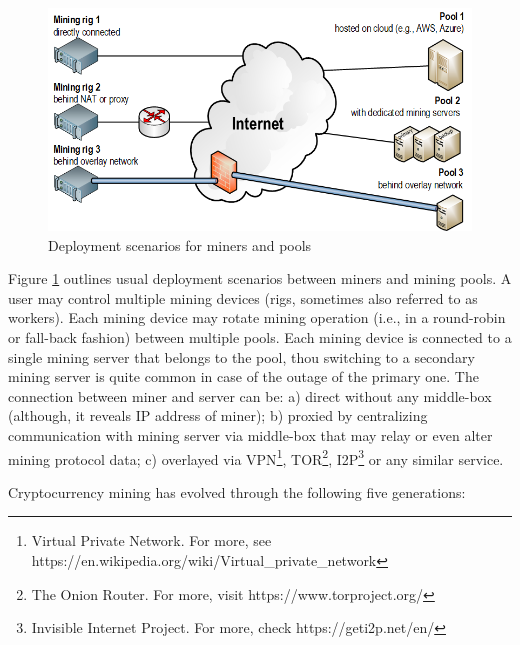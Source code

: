 \documentclass[preprint,12pt,3p]{elsarticle}
\begin{document}
\begin{figure}[ht]
    \centering
    \includegraphics[width=\textwidth]{deploy2.png}
    \caption{Deployment scenarios for miners and pools}
    \label{fig:deploy}
\end{figure}

Figure \ref{fig:deploy} outlines usual deployment scenarios between miners and mining pools. A user may control multiple mining devices (rigs, sometimes also referred to as workers). Each mining device may rotate mining operation (i.e., in a round-robin or fall-back fashion) between multiple pools. Each mining device is connected to a single mining server that belongs to the pool, thou switching to a secondary mining server is quite common in case of the outage of the primary one. The connection between miner and server can be: a) direct without any middle-box (although, it reveals IP address of miner); b) proxied by centralizing communication with mining server via middle-box that may relay or even alter mining protocol data; c) overlayed via VPN\footnote{Virtual Private Network. For more, see https://en.wikipedia.org/wiki/Virtual\_private\_network}, TOR\footnote{The Onion Router. For more, visit https://www.torproject.org/}, I2P\footnote{Invisible Internet Project. For more, check https://geti2p.net/en/} or any similar service.

Cryptocurrency mining has evolved through the following five generations:
\end{document}
